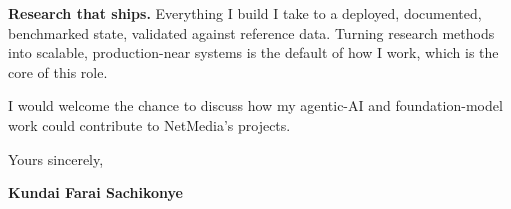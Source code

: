 \documentclass[12pt,a4paper]{article}
\begin{document}
\textbf{Research that ships.}
Everything I build I take to a deployed, documented, benchmarked state, validated
against reference data. Turning research methods into scalable, production-near
systems is the default of how I work, which is the core of this role.

I would welcome the chance to discuss how my agentic-AI and foundation-model work
could contribute to NetMedia's projects.

\vspace{1.5em}
Yours sincerely,

\vspace{2.5em}
\textbf{Kundai Farai Sachikonye}
\end{document}

